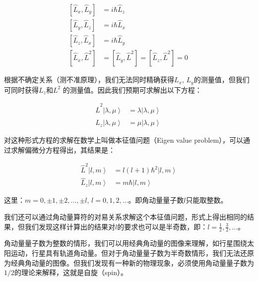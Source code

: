 \begin{align}
\left[ {\hat L_x ,\hat L_y } \right] &= i\hbar \hat L_z \\
\left[ {\hat L_y ,\hat L_z } \right] &= i\hbar \hat L_x \\
\left[ {\hat L_z, \hat L_x } \right] &= i\hbar \hat L_y \\
\left[ {\hat L_x ,\hat L^2 } \right] &= \left[ {\hat L_y ,\hat L^2 }
\right] = \left[ {\hat L_z ,\hat L^2 } \right] = 0~
\end{align}

根据不确定关系（测不准原理），我们无法同时精确获得$L_x$, $L_y$的测量值，但我们可同时获得$L_z$和$L^2$
的测量值。因此我们预期可求解出以下方程：

\begin{align}
\hat L^2 \left| {\lambda ,\mu } \right\rangle &= \lambda \left| {\lambda ,\mu } \right\rangle \\
\hat L_z \left| {\lambda ,\mu } \right\rangle &= \mu \left| {\lambda ,\mu } \right\rangle~
\end{align}

对这种形式方程的求解在数学上叫做本征值问题（Eigen value problem），可以通过求解偏微分方程得出，其结果是：

\begin{align}
\hat L^2 \left| {l,m} \right\rangle &= l\left( {l + 1} \right)\hbar ^2 \left| {l,m} \right\rangle \\
\hat L_z \left| {l,m} \right\rangle &= m\hbar \left| {l,m} \right\rangle~
\end{align}

这里：$m = 0, \pm 1, \pm 2,..., \pm l$, $l = 0,1,2,...$。即角动量量子数$l$只能取整数。

我们还可以通过角动量算符的对易关系求解这个本征值问题，形式上得出相同的结果，但我们发现这样计算出的结果对$l$的要求也可以是半奇数，即：$l = \tfrac{1} {2},\tfrac{3} {2},...$。

角动量量子数为整数的情形，我们可以用经典角动量的图像来理解，如行星围绕太阳运动，行星具有轨道角动量。但对于角动量量子数为半奇数情形，我们无法还原为经典角动量的图像。但我们发现有一种新的物理现象，必须使用角动量量子数为$1/2$的理论来解释，这就是自旋（spin）。
